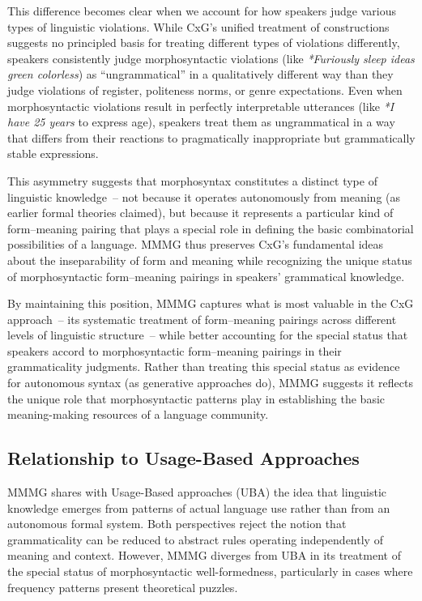 \documentclass[12pt,letterpaper]{article}
\begin{document}
This difference becomes clear when we account for how speakers judge various types of linguistic violations. While CxG's unified treatment of constructions suggests no principled basis for treating different types of violations differently, speakers consistently judge morphosyntactic violations (like \textit{*Furiously sleep ideas green colorless}) as ``ungrammatical'' in a qualitatively different way than they judge violations of register, politeness norms, or genre expectations. Even when morphosyntactic violations result in perfectly interpretable utterances (like \textit{*I have 25 years} to express age), speakers treat them as ungrammatical in a way that differs from their reactions to pragmatically inappropriate but grammatically stable expressions.

This asymmetry suggests that morphosyntax constitutes a distinct type of linguistic knowledge~-- not because it operates autonomously from meaning (as earlier formal theories claimed), but because it represents a particular kind of form--meaning pairing that plays a special role in defining the basic combinatorial possibilities of a language. MMMG thus preserves CxG's fundamental ideas about the inseparability of form and meaning while recognizing the unique status of morphosyntactic form--meaning pairings in speakers' grammatical knowledge.

By maintaining this position, MMMG captures what is most valuable in the CxG approach~-- its systematic treatment of form--meaning pairings across different levels of linguistic structure~-- while better accounting for the special status that speakers accord to morphosyntactic form--meaning pairings in their grammaticality judgments. Rather than treating this special status as evidence for autonomous syntax (as generative approaches do), MMMG suggests it reflects the unique role that morphosyntactic patterns play in establishing the basic meaning-making resources of a language community.

\subsection{Relationship to Usage-Based Approaches}

MMMG shares with Usage-Based approaches (UBA) \autocite{bybee2006, bybee2007frequency, bybee2010} the idea that linguistic knowledge emerges from patterns of actual language use rather than from an autonomous formal system. Both perspectives reject the notion that grammaticality can be reduced to abstract rules operating independently of meaning and context. However, MMMG diverges from UBA in its treatment of the special status of morphosyntactic well-formedness, particularly in cases where frequency patterns present theoretical puzzles.
\end{document}
